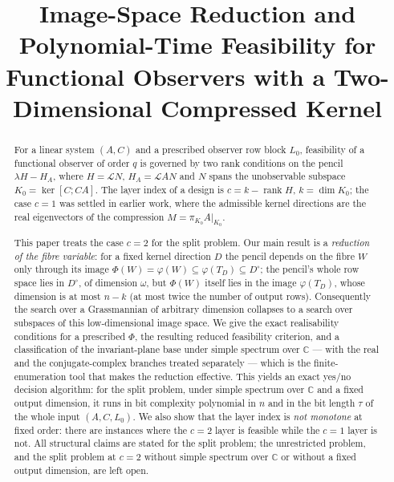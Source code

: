 \documentclass[journal]{IEEEtran}
\theoremstyle{plainn}
\theoremstyle{remark}
\newcommand{\rank}{\operatorname{rank}}
\begin{document}
\title{Image-Space Reduction and Polynomial-Time Feasibility for Functional Observers
with a Two-Dimensional Compressed Kernel}
\author{}
\maketitle

\begin{abstract}
For a linear system $(A,C)$ and a prescribed observer row block $L_0$, feasibility of a functional
observer of order $q$ is governed by two rank conditions on the pencil $\lambda H-H_A$, where
$H=\mathcal L N$, $H_A=\mathcal L AN$ and $N$ spans the unobservable subspace $K_0=\ker[C;CA]$. The layer index of a design
is $c=k-\rank H$, $k=\dim K_0$; the case $c=1$ was settled in earlier work, where the admissible kernel
directions are the real eigenvectors of the compression $M=\pi_{K_0}A|_{K_0}$.

This paper treats the case $c=2$ for the split problem. Our main result is a \emph{reduction of the fibre
variable}: for a fixed kernel direction $D$ the pencil depends on the fibre $W$ only through its image
$\Phi(W)=\varphi(W)\subseteq\varphi(T_D)\subseteq D^\circ$; the pencil's whole row space lies in
$D^\circ$, of dimension $\omega$, but $\Phi(W)$ itself lies in the image $\varphi(T_D)$, whose dimension
is at most $n-k$ (at most twice the number of output rows). Consequently the search over a Grassmannian
of arbitrary dimension collapses to a search over subspaces of this low-dimensional image space. We give
the exact realisability conditions for a prescribed $\Phi$, the resulting reduced feasibility criterion,
and a classification of the invariant-plane base under simple spectrum over $\mathbb C$ --- with the real
and the conjugate-complex branches treated separately --- which is the finite-enumeration tool that
makes the reduction effective. This yields an exact yes/no decision algorithm: for the split problem,
under simple spectrum over $\mathbb C$ and a fixed output dimension, it runs in bit complexity polynomial
in $n$ and in the bit length $\tau$ of the whole input $(A,C,L_0)$. We also show that the layer index is
\emph{not monotone} at fixed order: there are instances where the $c=2$ layer is feasible while the
$c=1$ layer is not. All structural claims are stated for the split problem; the unrestricted problem,
and the split problem at $c=2$ without simple spectrum over $\mathbb C$ or without a fixed output
dimension, are left open.
\end{abstract}
\end{document}
